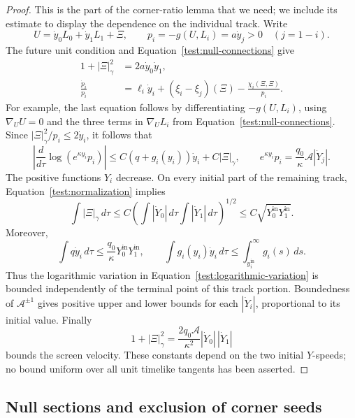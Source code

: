 \begin{proof}
This is the part of the corner-ratio lemma
\cite[]{Foundation} that we need; we include its
estimate to display the dependence on the individual track. Write
\[
 U=\dot y_0L_0+\dot y_1L_1+\Xi,
 \qquad p_i=-g(U,L_i)=a\dot y_j>0\quad(j=1-i).
\]
The future unit condition and Equation~\eqref{test:null-connections}
give
\begin{align}
 1+|\Xi|_\gamma^2&=2a\dot y_0\dot y_1,
       \label{test:normalization}\\
 \frac{\dot p_i}{p_i}
   &=\ell_i\dot y_i+(\xi_i-\xi_j)(\Xi)
                         -\frac{\chi_i(\Xi,\Xi)}{p_i}.
       \label{test:momentum}
\end{align}
For example, the last equation follows by differentiating
$-g(U,L_i)$, using $\nabla_UU=0$ and the three terms in
$\nabla_UL_i$ from Equation~\eqref{test:null-connections}.
Since $|\Xi|_\gamma^2/p_i\le2\dot y_i$, it follows that
\begin{equation}\label{test:logarithmic-variation}
 \left|\frac{d}{d\tau}\log(e^{\kappa y_i}p_i)\right|
  \le C(q+g_i(y_i))\dot y_i+C|\Xi|_\gamma,
 \qquad
 e^{\kappa y_i}p_i=\frac{q_0}{\kappa}\mathcal A|\dot Y_j|.
\end{equation}
The positive functions $Y_i$ decrease. On every initial part of the
remaining track, Equation~\eqref{test:normalization} implies
\[
 \int|\Xi|_\gamma\,d\tau
 \le C\left(\int|\dot Y_0|\,d\tau
                   \int|\dot Y_1|\,d\tau\right)^{1/2}
 \le C\sqrt{Y_0^{\mathrm{in}}Y_1^{\mathrm{in}}}.
\]
Moreover,
\[
 \int q\dot y_i\,d\tau
    \le\frac{q_0}{\kappa}Y_0^{\mathrm{in}}Y_1^{\mathrm{in}},
 \qquad
 \int g_i(y_i)\dot y_i\,d\tau
    \le\int_{y_i^{\mathrm{in}}}^{\infty}g_i(s)\,ds.
\]
Thus the logarithmic variation in
Equation~\eqref{test:logarithmic-variation} is bounded independently
of the terminal point of this track portion. Boundedness of
$\mathcal A^{\pm1}$ gives positive upper and lower bounds for each
$|\dot Y_i|$, proportional to its initial value. Finally
\[
 1+|\Xi|_\gamma^2
   =\frac{2q_0\mathcal A}{\kappa^2}
                 |\dot Y_0|\,|\dot Y_1|
\]
bounds the screen velocity. These constants depend on the two initial
$Y$-speeds; no bound uniform over all unit timelike tangents has been
asserted.
\end{proof}

\subsection{Null sections and exclusion of corner seeds}


